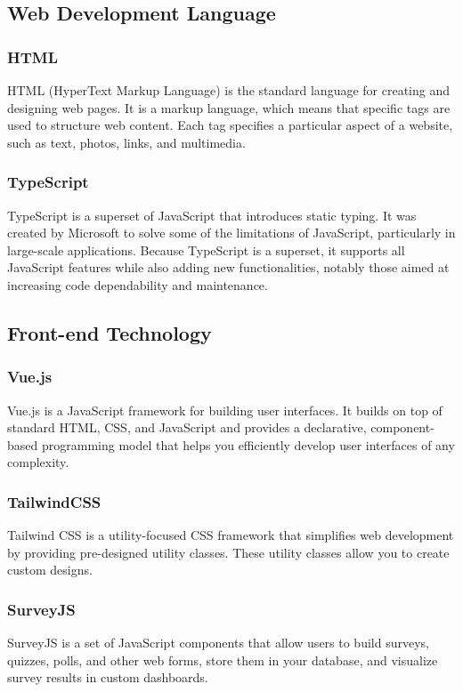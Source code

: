 \documentclass[12pt,oneside,openright,a4paper]{cpe-english-project}
\begin{document}
\subsection{Web Development Language}
\subsubsection{HTML} HTML (HyperText Markup Language) is the standard language for creating and designing web pages. It is a markup language, which means that specific tags are used to structure web content. Each tag specifies a particular aspect of a website, such as text, photos, links, and multimedia.

\subsubsection{TypeScript} TypeScript is a superset of JavaScript that introduces static typing. It was created by Microsoft to solve some of the limitations of JavaScript, particularly in large-scale applications. Because TypeScript is a superset, it supports all JavaScript features while also adding new functionalities, notably those aimed at increasing code dependability and maintenance.

\subsection{Front-end Technology}
\subsubsection{Vue.js} Vue.js is a JavaScript framework for building user interfaces. It builds on top of standard HTML, CSS, and JavaScript and provides a declarative, component-based programming model that helps you efficiently develop user interfaces of any complexity.

\subsubsection{TailwindCSS} Tailwind CSS is a utility-focused CSS framework that simplifies web development by providing pre-designed utility classes. These utility classes allow you to create custom designs.

\subsubsection{SurveyJS} SurveyJS is a set of JavaScript components that allow users to build surveys, quizzes, polls, and other web forms, store them in your database, and visualize survey results in custom dashboards.
\end{document}
